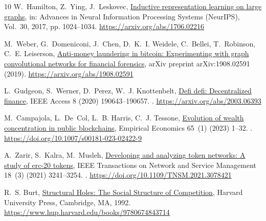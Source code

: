 \documentclass[final,5p,times]{elsarticle}
\begin{document}
\begin{thebibliography}{10}
W.~Hamilton, Z.~Ying, J.~Leskovec, \href{https://arxiv.org/abs/1706.02216}{Inductive representation learning on large graphs}, in: Advances in Neural Information Processing Systems (NeurIPS), Vol.~30, 2017, pp. 1024--1034.
\newline\urlprefix\url{https://arxiv.org/abs/1706.02216}

M.~Weber, G.~Domeniconi, J.~Chen, D.~K.~I. Weidele, C.~Bellei, T.~Robinson, C.~E. Leiserson, \href{https://arxiv.org/abs/1908.02591}{Anti-money laundering in bitcoin: Experimenting with graph convolutional networks for financial forensics}, arXiv preprint arXiv:1908.02591 (2019).
\newline\urlprefix\url{https://arxiv.org/abs/1908.02591}

L.~Gudgeon, S.~Werner, D.~Perez, W.~J. Knottenbelt, \href{https://arxiv.org/abs/2003.06393}{Defi defi: Decentralized finance}, IEEE Access 8 (2020) 190643--190657.
\newblock \href {https://doi.org/10.1109/ACCESS.2020.3031267} {}.
\newline\urlprefix\url{https://arxiv.org/abs/2003.06393}

M.~Campajola, L.~De~Col, L.~B. Harris, C.~J. Tessone, \href{https://doi.org/10.1007/s00181-023-02422-9}{Evolution of wealth concentration in public blockchains}, Empirical Economics 65~(1) (2023) 1--32.
\newblock \href {https://doi.org/10.1007/s00181-023-02422-9} {}.
\newline\urlprefix\url{https://doi.org/10.1007/s00181-023-02422-9}

A.~Zarir, S.~Kalra, M.~Musleh, \href{https://doi.org/10.1109/TNSM.2021.3078421}{Developing and analyzing token networks: A study of erc-20 tokens}, IEEE Transactions on Network and Service Management 18~(3) (2021) 3241--3254.
\newblock \href {https://doi.org/10.1109/TNSM.2021.3078421} {}.
\newline\urlprefix\url{https://doi.org/10.1109/TNSM.2021.3078421}

R.~S. Burt, \href{https://www.hup.harvard.edu/books/9780674843714}{Structural Holes: The Social Structure of Competition}, Harvard University Press, Cambridge, MA, 1992.
\newline\urlprefix\url{https://www.hup.harvard.edu/books/9780674843714}


\end{thebibliography}
\end{document}
